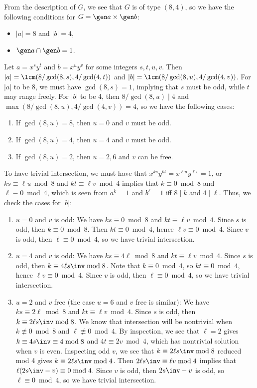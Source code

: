 \begin{solalph}
    \item From the description of $G$, we see that $G$ is of type $(8, 4)$, so we have the following conditions for $G = \gen a \times \gen b$:
    \begin{itemize}
        \item $|a| = 8$ and $|b| = 4$,
        \item $\gen a \cap \gen b = 1$.
    \end{itemize}
    Let $a = x^s y^t$ and $b = x^u y^v$ for some integers $s, t, u, v$. Then $|a| = \lcm(8/\gcd(8, s), 4/\gcd(4, t))$ and $|b| = \lcm(8/\gcd(8, u), 4/\gcd(4, v))$. For $|a|$ to be 8, we must have $\gcd(8, s) = 1$, implying that $s$ must be odd, while $t$ may range freely. For $|b|$ to be 4, then $8/\gcd(8, u) \mid 4$ and $\max(8/\gcd(8, u), 4/\gcd(4, v)) = 4$, so we have the following cases:
    \begin{enumerate}[label=(\arabic*)]
        \item If $\gcd(8, u) = 8$, then $u = 0$ and $v$ must be odd.
        \item If $\gcd(8, u) = 4$, then $u = 4$ and $v$ must be odd.
        \item If $\gcd(8, u) = 2$, then $u = 2, 6$ and $v$ can be free.
    \end{enumerate}
    To have trivial intersection, we must have that $x^{ks} y^{kt} = x^{\ell u} y^{\ell v} = 1$, or $ks \equiv \ell u \bmod 8$ and $kt \equiv \ell v \bmod 4$ implies that $k \equiv 0 \bmod 8$ and $\ell \equiv 0 \bmod 4$, which is seen from $a^k = 1$ and $b^\ell = 1$ iff $8 \mid k$ and $4 \mid \ell$. Thus, we check the cases for $|b|$:
    \begin{enumerate}[label=(\arabic*)]
        \item $u = 0$ and $v$ is odd: We have $ks \equiv 0 \bmod 8$ and $kt \equiv \ell v \bmod 4$. Since $s$ is odd, then $k \equiv 0 \bmod 8$. Then $kt \equiv 0 \bmod 4$, hence $\ell v \equiv 0 \bmod 4$. Since $v$ is odd, then $\ell \equiv 0 \bmod 4$, so we have trivial intersection.
        \item $u = 4$ and $v$ is odd: We have $ks \equiv 4\ell \bmod 8$ and $kt \equiv \ell v \bmod 4$. Since $s$ is odd, then $k \equiv 4\ell s\inv \bmod 8$. Note that $k \equiv 0 \bmod 4$, so $kt \equiv 0 \bmod 4$, hence $\ell v \equiv 0 \bmod 4$. Since $v$ is odd, then $\ell \equiv 0 \bmod 4$, so we have trivial intersection.
        \item $u = 2$ and $v$ free (the case $u = 6$ and $v$ free is similar): We have $ks \equiv 2\ell \bmod 8$ and $kt \equiv \ell v \bmod 4$. Since $s$ is odd, then $k \equiv 2 \ell s\inv \bmod 8$. We know that intersection will be nontrivial when $k \not\equiv 0 \bmod 8$ and $\ell \not\equiv 0 \bmod 4$. By inspection, we see that $\ell = 2$ gives $k \equiv 4s\inv \equiv 4 \bmod 8$ and $4t \equiv 2v \bmod 4$, which has nontrivial solution when $v$ is even. Inspecting odd $v$, we see that $k \equiv 2\ell s\inv \bmod 8$ reduced mod 4 gives $k \equiv 2 \ell s\inv \bmod 4$. Then $2 \ell s\inv \equiv \ell v \bmod 4$ implies that $\ell(2s\inv - v) \equiv 0 \bmod 4$. Since $v$ is odd, then $2s\inv - v$ is odd, so $\ell \equiv 0 \bmod 4$, so we have trivial intersection.

\end{enumerate}
\end{solalph}

